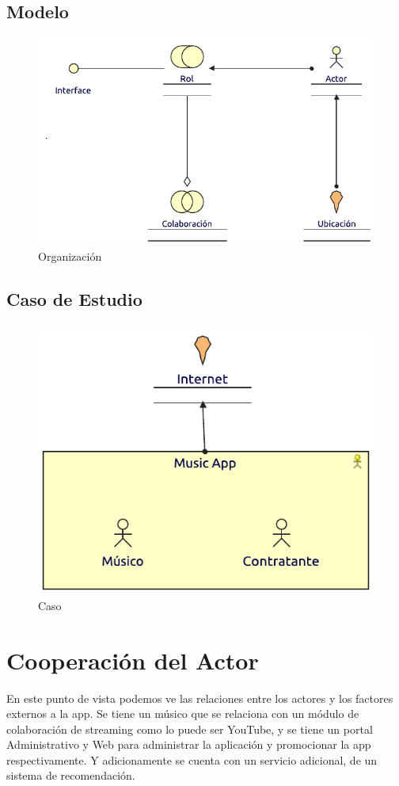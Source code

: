 \subsection{Modelo}
\begin{figure}[h!]
	\centering
	\includegraphics[width=\linewidth]{Arquitectura/Negocio/imgs/organizacion.pdf}
	\caption{Organización}
\end{figure}
\newpage
\subsection{Caso de Estudio}

\begin{figure}[h!]
	\centering
	\includegraphics[width=0.8\linewidth]{Arquitectura/Negocio/imgs/caso.pdf}
	\caption{Caso}
\end{figure}

\newpage

\section{Cooperación del Actor}
En este punto de vista podemos ve las relaciones entre los actores y los factores externos a la app. Se tiene un músico que se relaciona con un módulo de colaboración de streaming como lo puede ser YouTube, y se tiene un portal Administrativo y Web para administrar la aplicación y promocionar la app respectivamente. Y adicionamente se cuenta con un servicio adicional, de un sistema de recomendación.
